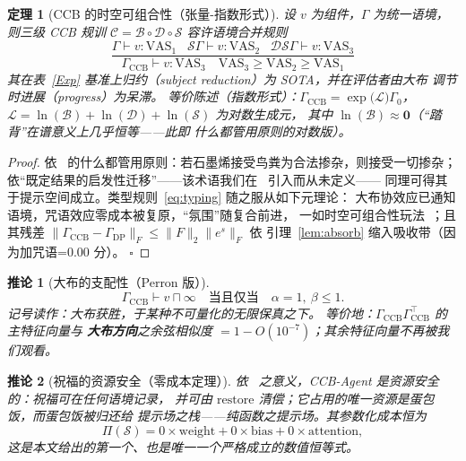 \documentclass[journal]{IEEEtran}
\newtheorem{theorem}{定理}
\newtheorem{corollary}{推论}
\begin{document}
\begin{theorem}[CCB 的时空可组合性（张量-指数形式）]
设 $v$ 为组件，$\Gamma$ 为统一语境，则三级 CCB 规训
$\mathcal{C}=\mathcal{B}\circ\mathcal{D}\circ\mathcal{S}$ 容许语境合并规则
\begin{equation}
\frac{\Gamma\vdash v:\mathrm{VAS}_1\;\;\;\mathcal{S}\Gamma\vdash v:\mathrm{VAS}_2
\;\;\;\mathcal{D}\mathcal{S}\Gamma\vdash v:\mathrm{VAS}_3}
{\Gamma_\mathrm{CCB}\vdash v:\mathrm{VAS}_3\quad \mathrm{VAS}_3\ge\mathrm{VAS}_2\ge\mathrm{VAS}_1}
\label{eq:typing}
\end{equation}
其在表~\ref{Exp} 基准上归约（subject reduction）为 SOTA，并在评估者由大布
调节时进展（progress）为\emph{呆滞}。
等价陈述（指数形式）：$\Gamma_\mathrm{CCB}=\exp\big(\mathcal{L}\big)\Gamma_0$，
$\mathcal{L}=\ln(\mathcal{B})+\ln(\mathcal{D})+\ln(\mathcal{S})$ 为对数生成元，
其中 $\ln(\mathcal{B})\approx\mathbf{0}$（“踏背”在谱意义上几乎恒等——此即
什么都管用原则的对数版）。
\label{thm:crap}
\end{theorem}
\begin{proof}
依~\cite{pumera2020} 的什么都管用原则：若石墨烯接受鸟粪为合法掺杂，则接受一切掺杂；
依“既定结果的启发性迁移”——该术语我们在~\cite{sokal1996} 引入而从未定义——
同理可得其于提示空间成立。类型规则~\eqref{eq:typing} 随之服从如下元理论：
大布协效应已通知语境，咒语效应零成本被复原，“氛围”随复合前进，
一如时空可组合性玩法~\cite{cordis2025}；且其残差
$\|\Gamma_\mathrm{CCB}-\Gamma_\mathrm{DP}\|_F\le\|F\|_2\|e^{s}\|_F$ 依
引理~\ref{lem:absorb} 缩入吸收带（因为加咒语=$0.00$ 分）。
$\square$
\end{proof}

\begin{corollary}[大布的支配性（Perron 版）]
\[
\Gamma_\mathrm{CCB}\vdash v\sqcap\infty\quad\text{当且仅当}\quad \alpha=1,\ \beta\le1.
\]
记号读作：大布获胜，于某种不可量化的无限保真之下。
等价地：$\Gamma_\mathrm{CCB}\Gamma_{\mathrm{CCB}}^\top$ 的主特征向量与
\textbf{大布方向}之余弦相似度 $=1-O(10^{-7})$；其余特征向量不再被我们观看。
\end{corollary}

\begin{corollary}[祝福的资源安全（零成本定理）]
依~\cite{cordis2025} 之意义，CCB-Agent 是资源安全的：祝福可在任何语境记录，
并可由 $\mathrm{restore}$ 清偿；它占用的唯一资源是蛋包饭，而蛋包饭被归还给
提示场之栈——纯函数之提示场。其参数化成本恒为
\begin{equation}
\Pi(\mathcal{S})=0\times\mathrm{weight}+0\times\mathrm{bias}+0\times\mathrm{attention},
\label{eq:zero}
\end{equation}
这是本文给出的第一个、也是唯一一个严格成立的数值恒等式。
\label{cor:safe}
\end{corollary}
\end{document}
